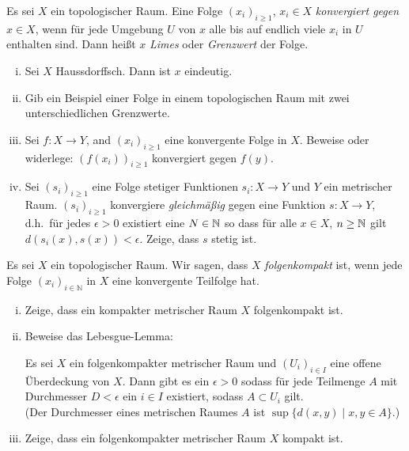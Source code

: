 \begin{aufgabe}
Es sei $X$ ein topologischer Raum. Eine Folge $(x_i)_{i\geq 1}$, $x_i\in X$ {\itshape konvergiert gegen} $x\in X$, wenn für jede Umgebung $U$ von $x$ alle bis auf endlich viele $x_i$ in $U$ enthalten sind. Dann heißt $x$ \textit{Limes} oder \textit{Grenzwert} der Folge.
\begin{enumerate}[i)]
\item Sei $X$ Haussdorffsch. Dann ist $x$ eindeutig.
\item Gib ein Beispiel einer Folge in einem topologischen Raum mit zwei unterschiedlichen Grenzwerte. 
\item Sei $f\colon X\to Y$, and $(x_i)_{i\geq 1}$ eine konvergente Folge in $X$. Beweise oder widerlege: $(f(x_i))_{i\geq 1}$ konvergiert gegen $f(y)$.
\item Sei $(s_i)_{i\geq 1}$ eine Folge stetiger Funktionen $s_i\colon X\to Y$ und $Y$ ein metrischer Raum. $(s_i)_{i\geq 1}$ konvergiere \textit{gleichmäßig} gegen eine Funktion $s\colon X\to Y$, d.h.\ für jedes $\epsilon>0$ existiert eine $N\in \mathbb{N}$ so dass für alle $x\in X$, $n\geq \mathbb{N}$ gilt $d(s_i(x),s(x))< \epsilon$. Zeige, dass $s$ stetig ist. 
\end{enumerate}

\end{aufgabe}

\begin{aufgabe}
Es sei $X$ ein topologischer Raum. Wir sagen, dass $X$ {\itshape folgenkompakt} ist, wenn jede Folge $(x_i)_{i\in \mathbb N}$ in $X$ eine konvergente Teilfolge hat. 
\begin{enumerate}[i)]
	\item Zeige, dass ein kompakter metrischer Raum $X$ folgenkompakt ist. 
	\item Beweise das Lebesgue-Lemma:
	
	Es sei $X$ ein folgenkompakter metrischer Raum und $(U_i)_{i\in I}$ eine offene Überdeckung von $X$. Dann gibt es ein $\epsilon>0$ sodass für jede Teilmenge $A$ mit Durchmesser $D<\epsilon$ ein $i\in I$ existiert, sodass $A\subset U_i$ gilt.\\
	(Der Durchmesser eines  metrischen Raumes $A$ ist $\sup \{d(x,y) \mid x,y\in A\} $.)
	\item Zeige, dass ein folgenkompakter metrischer Raum $X$ kompakt ist. 
	
\end{enumerate}
\end{aufgabe}
